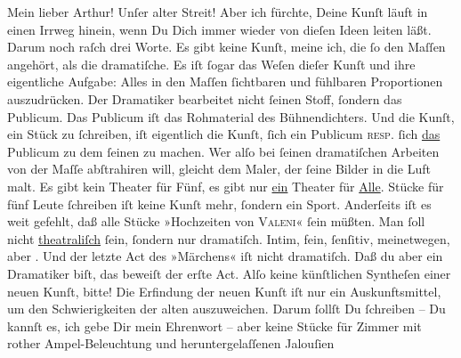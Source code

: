 \pstart\center{}Mein lieber Arthur!\pend\vspace{0.5em}
\pstart
           Unſer alter Streit! Aber ich fürchte, Deine Kunſt läuft in einen Irrweg hinein, wenn
               Du Dich immer wieder von dieſen Ideen leiten läßt. Darum noch raſch drei Worte. Es
               gibt keine Kunſt, meine ich, die{ }ſo  den Maſſen angehört, als die dramatiſche. Es iſt{ }ſogar das Weſen dieſer Kunſt
               und ihre eigentliche Aufgabe: Alles in den Maſſen{ }ſichtbaren und fühlbaren
               Proportionen auszudrücken. Der Dramatiker bearbeitet nicht{ }ſeinen Stoff,{ }ſondern das
               Publicum. Das Publicum iſt das Rohmaterial des Bühnendichters. Und die Kunſt, ein
               Stück zu{ }ſchreiben, iſt eigentlich die Kunſt,{ }ſich ein Publicum \textsc{resp.}{ }ſich \uline{das} Publicum {\pb}zu dem{ }ſeinen zu machen. Wer alſo bei{ }ſeinen
               dramatiſchen Arbeiten von der Maſſe abſtrahiren will, gleicht dem Maler, der{ }ſeine
               Bilder in die Luft malt. Es gibt kein Theater für Fünf, es gibt nur \uline{ein} Theater für \uline{Alle}.
               Stücke für fünf Leute{ }ſchreiben iſt keine Kunſt mehr,{ }ſondern ein Sport. Anderſeits
               iſt es weit gefehlt, daß alle Stücke »Hochzeiten von
                     \textsc{Valeni}«{ }ſein müßten. Man{ }ſoll nicht \uline{theatraliſch}{ }ſein,{ }ſondern nur dramatiſch. Intim, fein,{ }ſenſitiv, meinetwegen, aber . Und der letzte Act des »Märchens« iſt
               nicht dramatiſch. Daß du aber ein Dramatiker biſt, {\pb}das beweiſt der erſte Act. Alſo keine künſtlichen Syntheſen einer neuen Kunſt,
               bitte! Die Erfindung der neuen Kunſt iſt nur ein Auskunftsmittel, um den
               Schwierigkeiten der alten auszuweichen. Darum{ }ſollſt Du{ }ſchreiben – Du kannſt es, ich
               gebe Dir mein Ehrenwort – aber keine Stücke für Zimmer mit rother Ampel-Beleuchtung
               und heruntergelaſſenen Jalouſien{\dotsfive}\pend
           

